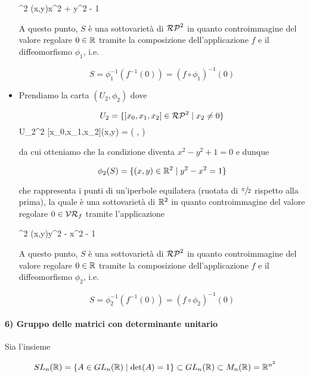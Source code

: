 \begin{itemize}
	{\R^{2}}{\R}
	{(x,y)}{x^{2} + y^{2} - 1}
	
	A questo punto, $ S $ è una sottovarietà di $ \mathcal{RP}^{2} $ in quanto controimmagine del valore regolare $ 0 \in \mathbb{R} $ tramite la composizione dell'applicazione $ f $	e il diffeomorfismo $ \phi_{1} $, i.e.
	
	\begin{equation}
		S = \phi_{1}^{-1} (f^{-1}(0)) = (f \circ \phi_{1})^{-1} (0)
	\end{equation}
	
	\item Prendiamo la carta $ (U_{2},\phi_{2}) $ dove
	
	\begin{equation}
		U_{2} = \{ [x_{0},x_{1},x_{2}] \in \mathcal{RP}^{2} \mid x_{2} \neq 0 \}
	\end{equation}
		{U_{2}}{\R^{2}}
		{[x_{0},x_{1},x_{2}]}{(x,y) = \left( ,  \right)}
	
	da cui otteniamo che la condizione diventa $ x^{2} - y^{2} + 1 = 0 $ e dunque
	
	\begin{equation}
		\phi_{2}(S) = \{ (x,y) \in \mathbb{R}^{2} \mid y^{2} - x^{2} = 1 \}
	\end{equation}
	
	che rappresenta i punti di un'iperbole equilatera (ruotata di $ \sfrac{\pi}{2} $ rispetto alla prima), la quale è una sottovarietà di $ \mathbb{R}^{2} $ in quanto controimmagine del valore regolare $ 0 \in \mathcal{VR}_{f} $ tramite l'applicazione
	
		{\R^{2}}{\R}
		{(x,y)}{y^{2} - x^{2} - 1}
	
	A questo punto, $ S $ è una sottovarietà di $ \mathcal{RP}^{2} $ in quanto controimmagine del valore regolare $ 0 \in \mathbb{R} $ tramite la composizione dell'applicazione $ f $	e il diffeomorfismo $ \phi_{2} $, i.e.
	
	\begin{equation}
		S = \phi_{2}^{-1} (f^{-1}(0)) = (f \circ \phi_{2})^{-1} (0)
	\end{equation}
\end{itemize}

\paragraph{6) Gruppo delle matrici con determinante unitario}\label{es:sl-subman}

Sia l'insieme

\begin{equation}
	SL_{n}(\mathbb{R}) = \{ A \in GL_{n}(\mathbb{R}) \mid \det(A) = 1 \} \subset GL_{n}(\mathbb{R}) \subset M_{n}(\mathbb{R}) = \mathbb{R}^{n^{2}}
\end{equation}

